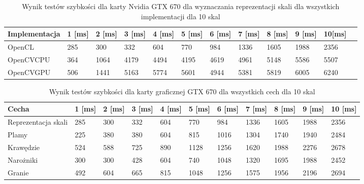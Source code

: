 \begin{table}[h]
\caption{Wynik testów szybkości dla karty Nvidia GTX 670 dla wyznaczania reprezentacji skali dla wszystkich implementacji dla 10 skal}
\label{tab:allGTX}

\begin{tabular}{|l|l|l|l|l|l|l|l|l|l|l|l|}
\hline
Implementacja & 1 [ms] & 2 [ms] & 3 [ms] & 4  [ms]  & 5 [ms]   & 6 [ms]   & 7  [ms]  & 8 [ms]   & 9 [ms]    & 10[ms]    \\ \hline
OpenCL               & 285        & 300               & 332      & 604  & 770  & 984  & 1336 & 1605 & 1988  & 2356  \\ \hline
OpenCVCPU            & 364        & 1064              & 4179     & 4494 & 4195 & 4619 & 4961 & 5148 & 5586  & 5507  \\ \hline
OpenCVGPU            & 506        & 1441              & 5163     & 5774 & 5601 & 4944 & 5381 & 5819 & 6005  & 6240  \\ \hline
\end{tabular}
\end{table}
\begin{table}[h]
\caption{Wynik testów szybkości dla karty graficznej GTX 670 dla wszystkich cech dla 10 skal}
\label{tab:allCechy}

\begin{tabular}{|p{2cm}|l|l|l|l|l|l|l|l|l|l|}
\hline
Cecha               & 1  [ms] & 2  [ms] & 3  [ms] & 4  [ms] & 5    [ms]& 6    [ms]& 7    [ms]& 8    [ms]& 9    [ms]& 10   [ms]\\ \hline
Reprezentacja skali & 285 & 300 & 332 & 604 & 770  & 984  & 1336 & 1605 & 1988 & 2356 \\ \hline
Plamy               & 225 & 380 & 380 & 604 & 815  & 1016 & 1304 & 1740 & 1940 & 2484 \\ \hline
Krawędzie           & 524 & 588 & 725 & 890 & 1128 & 1256 & 1620 & 1988 & 2276 & 2678 \\ \hline
Narożniki           & 300 & 300 & 428 & 604 & 740  & 1048 & 1320 & 1695 & 1988 & 2452 \\ \hline
Granie              & 492 & 604 & 665 & 815 & 1048 & 1256 & 1575 & 1956 & 2196 & 2694 \\ \hline
\end{tabular}
\end{table}